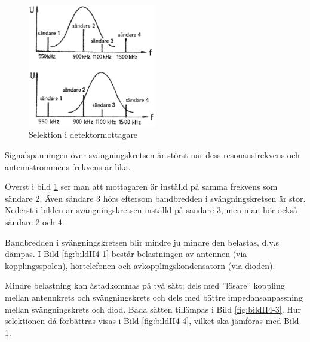 \begin{figure}
  \includegraphics[width=0.5\textwidth]{images/cropped_pdfs/bild_2_4-02.pdf}
  \caption{Selektion i detektormottagare}
  \label{fig:bildII4-2}
\end{figure}

Signalspänningen över svängningskretsen är störst när dess
resonansfrekvens och antennströmmens frekvens är lika.

Överst i bild \ref{fig:bildII4-2} ser man att mottagaren är inställd på
samma frekvens som sändare 2.
Även sändare 3 hörs eftersom bandbredden i svängningskretsen är stor.
Nederst i bilden är svängningskretsen inställd på sändare 3, men man hör
också sändare 2 och 4.

Bandbredden i svängningskretsen blir mindre ju mindre den belastas,
d.v.s dämpas.
I Bild \ref{fig:bildII4-1} består belastningen av antennen (via
kopplingsspolen), hörtelefonen och avkopplingskondensatorn (via dioden).

Mindre belastning kan åstadkommas på två sätt; dels med ''lösare''
koppling mellan antennkrets och svängningskrets och dels med bättre
impedansanpassning mellan svängningskrets och diod. Båda sätten
tillämpas i Bild \ref{fig:bildII4-3}. Hur selektionen då förbättras visas i
Bild \ref{fig:bildII4-4}, vilket ska jämföras med Bild \ref{fig:bildII4-2}.

